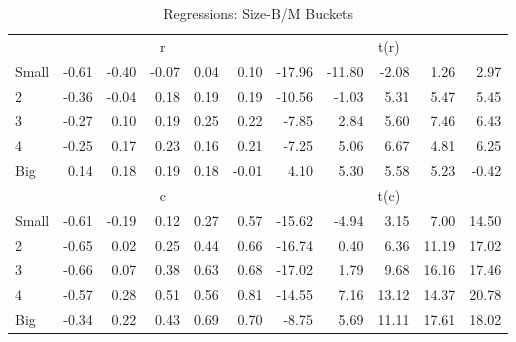 \begin{table}[!ht]
\begin{tabular}{lrrrrrrrrrr}
        & \multicolumn{5}{c}{r} & \multicolumn{5}{c}{t(r)} \\
  \cmidrule(r){2-6} \cmidrule(r){7-11}
  Small & -0.61 & -0.40 & -0.07 & 0.04 & 0.10 & -17.96 & -11.80 & -2.08 & 1.26 & 2.97 \\ 
  2 & -0.36 & -0.04 & 0.18 & 0.19 & 0.19 & -10.56 & -1.03 & 5.31 & 5.47 & 5.45 \\ 
  3 & -0.27 & 0.10 & 0.19 & 0.25 & 0.22 & -7.85 & 2.84 & 5.60 & 7.46 & 6.43 \\ 
  4 & -0.25 & 0.17 & 0.23 & 0.16 & 0.21 & -7.25 & 5.06 & 6.67 & 4.81 & 6.25 \\ 
  Big & 0.14 & 0.18 & 0.19 & 0.18 & -0.01 & 4.10 & 5.30 & 5.58 & 5.23 & -0.42 \\ 

        & \multicolumn{5}{c}{c} & \multicolumn{5}{c}{t(c)} \\
  \cmidrule(r){2-6} \cmidrule(r){7-11}
  Small & -0.61 & -0.19 & 0.12 & 0.27 & 0.57 & -15.62 & -4.94 & 3.15 & 7.00 & 14.50 \\ 
  2 & -0.65 & 0.02 & 0.25 & 0.44 & 0.66 & -16.74 & 0.40 & 6.36 & 11.19 & 17.02 \\ 
  3 & -0.66 & 0.07 & 0.38 & 0.63 & 0.68 & -17.02 & 1.79 & 9.68 & 16.16 & 17.46 \\ 
  4 & -0.57 & 0.28 & 0.51 & 0.56 & 0.81 & -14.55 & 7.16 & 13.12 & 14.37 & 20.78 \\ 
  Big & -0.34 & 0.22 & 0.43 & 0.69 & 0.70 & -8.75 & 5.69 & 11.11 & 17.61 & 18.02 \\ 
  \bottomrule
\end{tabular}
\caption{Regressions: Size-B/M Buckets} 
\label{}
\end{table}
